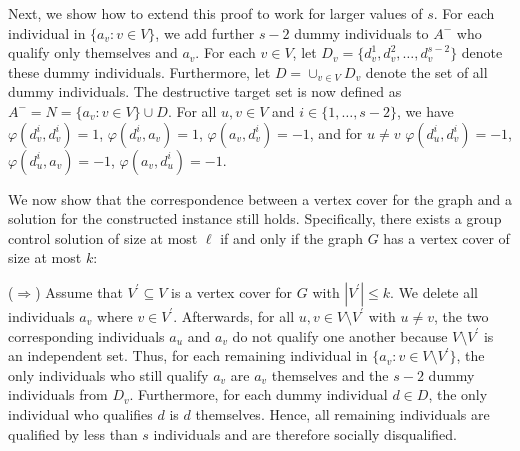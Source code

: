 \documentclass[
    12pt,               %
    a4paper,            %
    bibtotoc,           %
    pointlessnumbers,   %
    ngerman,            %
    titlepage,          %
    leqno,              %
    ]{scrarticle}       %
\begin{document}
\begin{Proof}
Next, we show how to extend this proof to work for larger values of $s$. For each individual in $\{ a_v : v \in V \}$, we add further $s-2$ dummy individuals to $A^-$ who qualify only themselves and $a_v$. For each $v \in V$, let $D_v = \{ d_v^1, d_v^2, \ldots, d_v^{s-2} \}$ denote these dummy individuals. Furthermore, let $D = \cup_{v \in V} D_v$ denote the set of all dummy individuals. The destructive target set is now defined as $A^- = N = \{ a_v : v \in V \} \cup D$. For all $u, v \in V$ and $i \in \{ 1, \ldots, s-2 \}$, we have $\varphi(d_v^i, d_v^i) = 1$, $\varphi(d_v^i, a_v) = 1$, $\varphi(a_v, d_v^i) = -1$, and for $u \neq v$ $\varphi(d_u^i, d_v^i) = -1$, $\varphi(d_u^i, a_v) = -1$, $\varphi(a_v, d_u^i) = -1$.

We now show that the correspondence between a vertex cover for the graph and a solution for the constructed instance still holds. Specifically, there exists a group control solution of size at most $\ell$ if and only if the graph $G$ has a vertex cover of size at most $k$:

($\Rightarrow$) Assume that $V^\prime \subseteq V$ is a vertex cover for $G$ with $|V^\prime| \leq k$. We delete all individuals $a_v$ where $v \in V^\prime$. Afterwards, for all $u, v \in V \setminus V^\prime$ with $u \neq v$, the two corresponding individuals $a_u$ and $a_v$ do not qualify one another because $V \setminus V^\prime$ is an independent set. Thus, for each remaining individual in $\{ a_v : v \in V \setminus V^\prime \}$, the only individuals who still qualify $a_v$ are $a_v$ themselves and the $s-2$ dummy individuals from $D_v$. Furthermore, for each dummy individual $d \in D$, the only individual who qualifies $d$ is $d$ themselves. Hence, all remaining individuals are qualified by less than $s$ individuals and are therefore socially disqualified.


\end{Proof}
\end{document}
